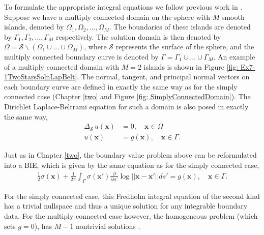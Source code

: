 \documentclass{sfuthesis}
\begin{document}
To formulate the appropriate integral equations we follow previous work in \cite{KropNig2014}. Suppose we have a multiply connected domain on the sphere with $M$ smooth islands, denoted by $\Omega_1, \Omega_2, ..., \Omega_M$. The boundaries of these islands are denoted by $\Gamma_1, \Gamma_2, ..., \Gamma_M$ respectively. The solution domain is then denoted by $\Omega=\mathcal{S} \backslash (\Omega_1 \cup ... \cup \Omega_M)$, where $\mathcal{S}$ represents the surface of the sphere, and  the multiply connected boundary curve is denoted by $\Gamma= \Gamma_1 \cup ... \cup \Gamma_M$.  An example of a multiply connected domain with $M=2$ islands is shown in Figure \ref{fig: Ex7-1TwoStarsSolnLapBelt}. The normal, tangent, and principal normal vectors on each boundary curve are defined in exactly the same way as for the simply connected case (Chapter \ref{two} and Figure \ref{fig: SimplyConnectedDomain}).  The Dirichlet Laplace-Beltrami equation for such a domain is also posed in exactly the same way, 
\begin{align*}
	\Delta_{\mathcal{S} \ } u(\mathbf{x})&=0 , \quad \mathbf{x}\in \Omega\\ 
	u(\mathbf{x})&=g(\mathbf{x}), \quad \mathbf{x} \in \Gamma. 
\end{align*}

Just as in Chapter \ref{two}, the boundary value problem above can be reformulated into a BIE, which is given by the same equation as for the simply connected case, 
\begin{align*}
	\frac{1}{2}\sigma(\mathbf{x}) + \frac{1}{2\pi} \int_{\Gamma} \sigma(\mathbf{x}') \frac{\partial}{\partial n'} \log {||\mathbf{x}-\mathbf{x}'||} ds' = g(\mathbf{x}), \quad \mathbf{x} \in \Gamma.
\end{align*}

For the simply connected case,  this Fredholm integral equation of the second kind has a trivial nullspace and thus a unique solution for any integrable boundary data. For the multiply connected case however, the homogeneous problem (which sets $g=0$), has $M-1$ nontrivial solutions \cite{KropNig2014}. 
\end{document}
